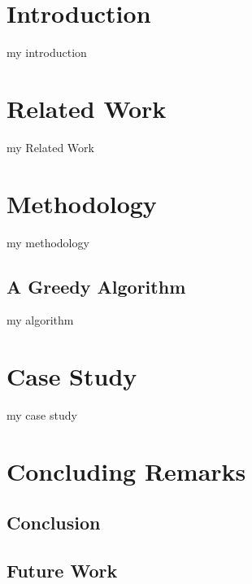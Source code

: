 \documentclass[ijgi,article,submit,moreauthors,pdftex]{Definitions/mdpi}
\begin{document}



\section{Introduction}

my introduction

\citet{Mackaness2017Generalization}


 
\section{Related Work}
\label{sec:realted_work}

my Related Work


\section{Methodology}
\label{sec:methodology}


my methodology




\subsection{A Greedy Algorithm}
\label{sec:greedy_algo}


my algorithm



\section{Case Study}
\label{sec:case_study}


my case study





\section{Concluding Remarks}
\label{sec:concluding_remarks}

\subsection{Conclusion}



\subsection{Future Work}
\end{document}
